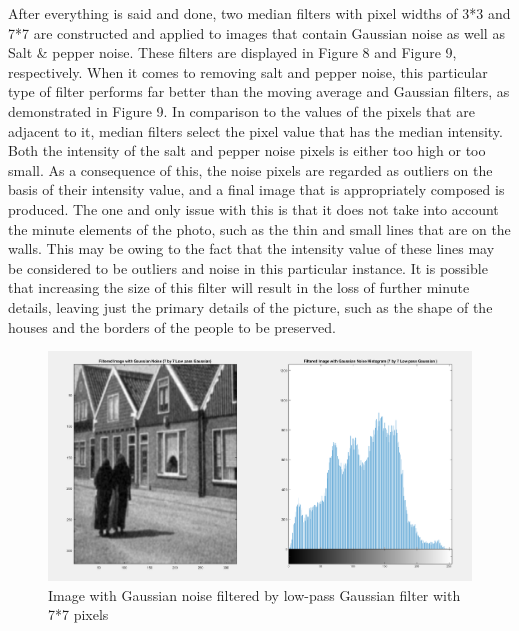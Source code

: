 After everything is said and done, two median filters with pixel widths of 3*3 and 7*7 are constructed and applied to images that contain Gaussian noise as well as Salt \& pepper noise. These filters are displayed in Figure 8 and Figure 9, respectively. When it comes to removing salt and pepper noise, this particular type of filter performs far better than the moving average and Gaussian filters, as demonstrated in Figure 9. In comparison to the values of the pixels that are adjacent to it, median filters select the pixel value that has the median intensity. Both the intensity of the salt and pepper noise pixels is either too high or too small. As a consequence of this, the noise pixels are regarded as outliers on the basis of their intensity value, and a final image that is appropriately composed is produced. The one and only issue with this is that it does not take into account the minute elements of the photo, such as the thin and small lines that are on the walls. This may be owing to the fact that the intensity value of these lines may be considered to be outliers and noise in this particular instance. It is possible that increasing the size of this filter will result in the loss of further minute details, leaving just the primary details of the picture, such as the shape of the houses and the borders of the people to be preserved.  

\newpage

\begin{figure} [ht]
    \centering
    \includegraphics[width = \textwidth]{Resources/Image with Gaussian noise filtered by low-pass Gaussian filter.png}
    \caption{Image with Gaussian noise filtered by low-pass Gaussian filter with 7*7 pixels}
    \label{fig:Gaussian noise filtered by low-pass Gaussian filter}
\end{figure}

